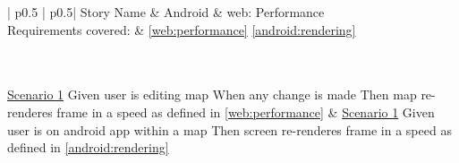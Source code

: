 \begin{longtable}{| p{} | p{}|}
	\hline
	\newline Story Name & \newline Android \& web: Performance\\\hline
	\newline Requirements covered: & \newline \ref{web:performance} \ref{android:rendering}\\\hline
	\\\hline
	\\\hline
	
	\newline\underline{Scenario 1}\newline
	Given user is editing map\newline
	When any change is made\newline 
	Then map re-renderes frame in a speed as defined in \ref{web:performance} \newline
	&
	\newline\underline{Scenario 1}\newline
	Given user is on android app within a map \newline
	Then screen re-renderes frame in a speed as defined in \ref{android:rendering} \newline
	
	\\\hline
\end{longtable}